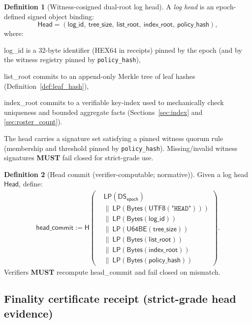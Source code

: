\documentclass[11pt]{article}
\newcommand{\MUST}{\textbf{MUST}}
\newcommand{\code}[1]{\texttt{#1}}
\newcommand{\term}[1]{\emph{#1}}
\newcommand{\1}{\mathbf{1}}
\newcommand{\Hash}{\mathsf{H}}
\newcommand{\DS}{\mathsf{DS}}
\newcommand{\LP}{\mathsf{LP}}
\theoremstyle{definition}
\newtheorem{definition}{Definition}
\theoremstyle{plain}
\begin{document}
\begin{definition}[Witness-cosigned dual-root log head]
\label{def:log_head}
A \term{log head} is an epoch-defined signed object binding:
\[
\textsf{Head} = (\textsf{log\_id},\ \textsf{tree\_size},\ \textsf{list\_root},\ \textsf{index\_root},\ \textsf{policy\_hash}),
\]
where:
\begin{tightitemize}
\item \textsf{log\_id} is a 32-byte identifier (HEX64 in receipts) pinned by the epoch (and by the witness registry pinned by \code{policy\_hash}),
\item \textsf{list\_root} commits to an append-only Merkle tree of leaf hashes (Definition~\ref{def:leaf_hash}),
\item \textsf{index\_root} commits to a verifiable key-index used to mechanically check uniqueness and bounded aggregate facts (Sections~\ref{sec:index} and \ref{sec:roster_count}).
\end{tightitemize}
The head carries a signature set satisfying a pinned witness quorum rule (membership and threshold pinned by \code{policy\_hash}). Missing/invalid witness signatures \MUST{} fail closed for strict-grade use.
\end{definition}

\begin{definition}[Head commit (verifier-computable; normative)]
\label{def:head_commit}
Given a log head $\textsf{Head}$, define:
\begin{align*}
\textsf{head\_commit}:=\Hash\!\left(\begin{aligned}
&\LP(\DS_{\textsf{epoch}})\\
&\|\ \LP(\mathsf{Bytes}(\textsf{UTF8}(\texttt{"HEAD"})))\\
&\|\ \LP(\mathsf{Bytes}(\textsf{log\_id}))\\
&\|\ \LP(\mathsf{U64BE}(\textsf{tree\_size}))\\
&\|\ \LP(\mathsf{Bytes}(\textsf{list\_root}))\\
&\|\ \LP(\mathsf{Bytes}(\textsf{index\_root}))\\
&\|\ \LP(\mathsf{Bytes}(\textsf{policy\_hash}))
\end{aligned}\right).
\end{align*}
Verifiers \MUST{} recompute \textsf{head\_commit} and fail closed on mismatch.
\end{definition}

\subsection{Finality certificate receipt (strict-grade head evidence)}
\end{document}
